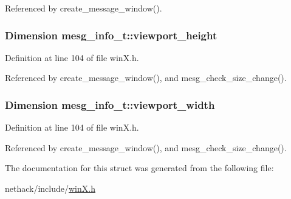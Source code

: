 Referenced by create\+\_\+message\+\_\+window().

\hypertarget{structmesg__info__t_a305a331f90a384bcdd196ee554eb4402}{
\subsubsection[{viewport\+\_\+height}]{\setlength{\rightskip}{0pt plus 5cm}Dimension mesg\+\_\+info\+\_\+t\+::viewport\+\_\+height}}\label{structmesg__info__t_a305a331f90a384bcdd196ee554eb4402}


Definition at line 104 of file win\+X.\+h.



Referenced by create\+\_\+message\+\_\+window(), and mesg\+\_\+check\+\_\+size\+\_\+change().

\hypertarget{structmesg__info__t_ae15ee1ff248f494358a3acafb446c19d}{
\subsubsection[{viewport\+\_\+width}]{\setlength{\rightskip}{0pt plus 5cm}Dimension mesg\+\_\+info\+\_\+t\+::viewport\+\_\+width}}\label{structmesg__info__t_ae15ee1ff248f494358a3acafb446c19d}


Definition at line 104 of file win\+X.\+h.



Referenced by create\+\_\+message\+\_\+window(), and mesg\+\_\+check\+\_\+size\+\_\+change().



The documentation for this struct was generated from the following file\+:\begin{DoxyCompactItemize}
\item 
nethack/include/\hyperlink{winX_8h}{win\+X.\+h}\end{DoxyCompactItemize}
